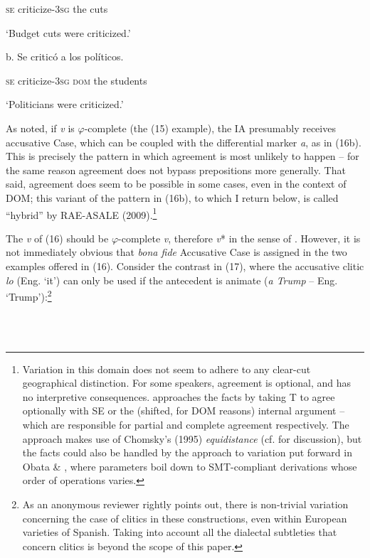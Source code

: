 \documentclass[output=paper]{langsci/langscibook}
\begin{document}
        \textsc{se} criticize\textsc{{}-3sg}  the  cuts

                 ‘Budget cuts were criticized.’

  b.   Se  criticó             a        los  políticos.             

      \textsc{se} criticize\textsc{{}-3sg  dom} the students

      ‘Politicians were criticized.’

As noted, if \textit{v} is $\varphi $-complete (the (15) example), the IA presumably receives accusative Case, which can be coupled with the differential marker \textit{a}, as in (16b). This is precisely the pattern in which agreement is most unlikely to happen – for the same reason agreement does not bypass prepositions more generally. That said, agreement does seem to be possible in some cases, even in the context of DOM; this variant of the pattern in (16b), to which I return below, is called “hybrid” by RAE-ASALE (2009).\footnote{Variation in this domain does not seem to adhere to any clear-cut geographical distinction. For some speakers, agreement is optional, and has no interpretive consequences. \citet{Planells2017} approaches the facts by taking T to agree optionally with SE or the (shifted, for DOM reasons) internal argument – which are responsible for partial and complete agreement respectively. The approach makes use of Chomsky’s (1995) \textit{equidistance} (cf. \citealt{Gallego2013} for discussion), but the facts could also be handled by the approach to variation put forward in Obata \& \citet{Epstein2016}, where parameters boil down to SMT-compliant derivations whose order of operations varies.}

  The \textit{v} of (16) should be $\varphi $-complete \textit{v}, therefore \textit{v}* in the sense of \citet{Chomsky2001}. However, it is not immediately obvious that \textit{bona fide} Accusative Case is assigned in the two examples offered in (16). Consider the contrast in (17), where the accusative clitic \textit{lo} (Eng. ‘it’) can only be used if the antecedent is animate (\textit{a Trump} – Eng. ‘Trump’):\footnote{As an anonymous reviewer rightly points out, there is non-trivial variation concerning the case of clitics in these constructions, even within European varieties of Spanish. Taking into account all the dialectal subtleties that concern clitics is beyond the scope of this paper.}

\ea%
    \label{ex:key:17}
    \gll\\
        \\
    \glt
    \z
\end{document}
